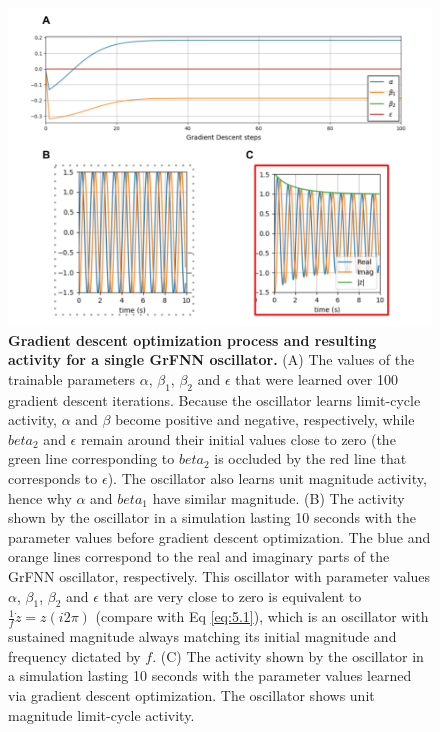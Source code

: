 \documentclass{report}
\begin{document}
\begin{figure}
    \centering
    \includegraphics[width=1.0\textwidth]{figures/fig5_1.png}
    \caption[Gradient descent optimization process and resulting activity for a single GrFNN oscillator]{\textbf{Gradient descent optimization process and resulting activity for a single GrFNN oscillator.} (A) The values of the trainable parameters $\alpha$, $\beta_1$, $\beta_2$ and $\epsilon$ that were learned over 100 gradient descent iterations. Because the oscillator learns limit-cycle activity, $\alpha$ and $\beta$ become positive and negative, respectively, while $beta_2$ and $\epsilon$ remain around their initial values close to zero (the green line corresponding to $beta_2$ is occluded by the red line that corresponds to $\epsilon$). The oscillator also learns unit magnitude activity, hence why $\alpha$ and $beta_1$ have similar magnitude. (B) The activity shown by the oscillator in a simulation lasting 10 seconds with the parameter values before gradient descent optimization. The blue and orange lines correspond to the real and imaginary parts of the GrFNN oscillator, respectively. This oscillator with parameter values $\alpha$, $\beta_1$, $\beta_2$ and $\epsilon$ that are very close to zero is equivalent to $\frac{1}{f}\dot{z}=z(i2\pi)$ (compare with Eq \eqref{eq:5.1}), which is an oscillator with sustained magnitude always matching its initial magnitude and frequency dictated by $f$. (C) The activity shown by the oscillator in a simulation lasting 10 seconds with the parameter values learned via gradient descent optimization. The oscillator shows unit magnitude limit-cycle activity.} 
    \label{f5_1}
\end{figure}
\end{document}
